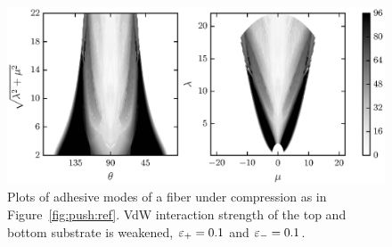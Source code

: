 {	\begin{figure}[t]
		\begin{center}
			\includegraphics{./fig/ch3/push/eb0.1_et0.1/grid.eps}
		\end{center}		
		\caption{Plots of adhesive modes of a fiber under compression as in Figure~\ref{fig:push:ref}. VdW interaction strength of the top and bottom substrate is weakened, $\varepsilon_+=0.1$ and $\varepsilon_-=0.1$.
		\label{fig:push:eb0.1_et0.1}}
	\end{figure}	

}
